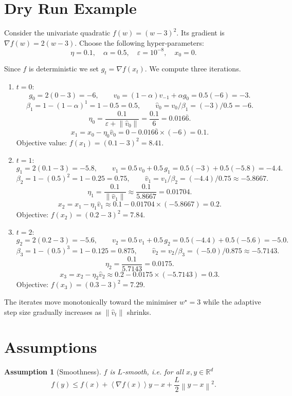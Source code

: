 \documentclass[11pt]{article}
\newtheorem{assumption}{Assumption}
\newcommand{\RR}{\mathbb{R}}
\newcommand{\norm}[1]{\left\|#1\right\|}
\newcommand{\inner}[1]{\left\langle #1 \right\rangle}
\newcommand{\grad}{\nabla}
\begin{document}
\section*{Dry Run Example}
Consider the univariate quadratic $f(w)=(w-3)^{2}$.  
Its gradient is $ \grad f(w)=2(w-3)$.  
Choose the following hyper‑parameters:
\[
\eta=0.1,\quad \alpha=0.5,\quad \varepsilon=10^{-8},\quad x_{0}=0 .
\]

Since $f$ is deterministic we set $g_{t}= \grad f(x_{t})$.
We compute three iterations.

\begin{enumerate}[leftmargin=*,label=\textbf{Iteration \arabic*:}]
\item $t=0$:
\[
g_{0}=2(0-3)=-6,\qquad 
v_{0}=(1-\alpha)v_{-1}+\alpha g_{0}=0.5(-6)=-3 .
\]
\[
\beta_{1}=1-(1-\alpha)^{1}=1-0.5=0.5,\qquad 
\hat v_{0}=v_{0}/\beta_{1}=(-3)/0.5=-6 .
\]
\[
\eta_{0}= \frac{0.1}{\varepsilon+\norm{\hat v_{0}}}= \frac{0.1}{6}=0.016\overline{6}.
\]
\[
x_{1}=x_{0}-\eta_{0}\hat v_{0}=0-0.016\overline{6}\times(-6)=0.1 .
\]
Objective value: $f(x_{1})=(0.1-3)^{2}=8.41$.

\item $t=1$:
\[
g_{1}=2(0.1-3)=-5.8,\qquad 
v_{1}=0.5\,v_{0}+0.5\,g_{1}=0.5(-3)+0.5(-5.8)=-4.4 .
\]
\[
\beta_{2}=1-(0.5)^{2}=1-0.25=0.75,\qquad 
\hat v_{1}=v_{1}/\beta_{2}=(-4.4)/0.75\approx -5.8667 .
\]
\[
\eta_{1}= \frac{0.1}{\norm{\hat v_{1}}}\approx\frac{0.1}{5.8667}=0.01704 .
\]
\[
x_{2}=x_{1}-\eta_{1}\hat v_{1}\approx0.1-0.01704\times(-5.8667)=0.2 .
\]
Objective: $f(x_{2})=(0.2-3)^{2}=7.84$.

\item $t=2$:
\[
g_{2}=2(0.2-3)=-5.6,\qquad 
v_{2}=0.5\,v_{1}+0.5\,g_{2}=0.5(-4.4)+0.5(-5.6)=-5.0 .
\]
\[
\beta_{3}=1-(0.5)^{3}=1-0.125=0.875,\qquad 
\hat v_{2}=v_{2}/\beta_{3}=(-5.0)/0.875\approx -5.7143 .
\]
\[
\eta_{2}= \frac{0.1}{5.7143}=0.0175 .
\]
\[
x_{3}=x_{2}-\eta_{2}\hat v_{2}\approx0.2-0.0175\times(-5.7143)=0.3 .
\]
Objective: $f(x_{3})=(0.3-3)^{2}=7.29$.
\end{enumerate}
The iterates move monotonically toward the minimiser $w^{\star}=3$ while the
adaptive step size gradually increases as $\norm{\hat v_{t}}$ shrinks.

\newpage
\section*{Assumptions}
\begin{assumption}[Smoothness]\label{ass:smooth}
$f$ is $L$‑smooth, i.e. for all $x,y\in\RR^{d}$
\[
f(y)\le f(x)+\inner{\grad f(x)}{y-x}+\frac{L}{2}\norm{y-x}^{2}.
\tag{A1}
\]
\end{assumption}
\end{document}
